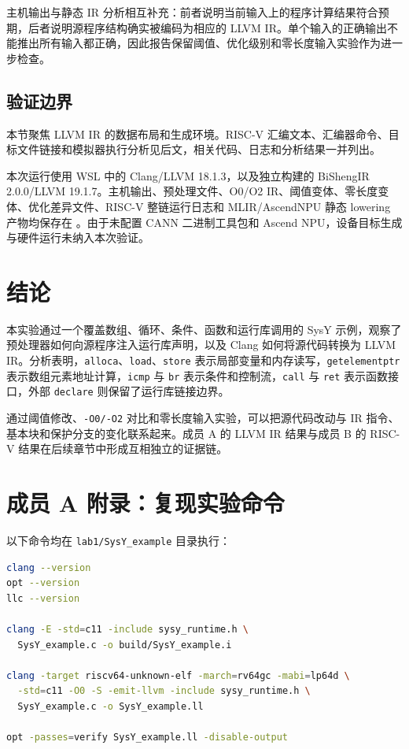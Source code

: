 \documentclass[a4paper]{article}
\begin{document}
主机输出与静态 IR 分析相互补充：前者说明当前输入上的程序计算结果符合预期，后者说明源程序结构确实被编码为相应的 LLVM IR。单个输入的正确输出不能推出所有输入都正确，因此报告保留阈值、优化级别和零长度输入实验作为进一步检查。

\subsection{验证边界}

本节聚焦 LLVM IR 的数据布局和生成环境。RISC-V 汇编文本、汇编器命令、目标文件链接和模拟器执行分析见后文，相关代码、日志和分析结果一并列出。

本次运行使用 WSL 中的 Clang/LLVM 18.1.3，以及独立构建的 BiShengIR 2.0.0/LLVM 19.1.7。主机输出、预处理文件、O0/O2 IR、阈值变体、零长度变体、优化差异文件、RISC-V 整链运行日志和 MLIR/AscendNPU 静态 lowering 产物均保存在 。由于未配置 CANN 二进制工具包和 Ascend NPU，设备目标生成与硬件运行未纳入本次验证。

\section{结论}

本实验通过一个覆盖数组、循环、条件、函数和运行库调用的 SysY 示例，观察了预处理器如何向源程序注入运行库声明，以及 Clang 如何将源代码转换为 LLVM IR。分析表明，\texttt{alloca}、\texttt{load}、\texttt{store} 表示局部变量和内存读写，\texttt{getelementptr} 表示数组元素地址计算，\texttt{icmp} 与 \texttt{br} 表示条件和控制流，\texttt{call} 与 \texttt{ret} 表示函数接口，外部 \texttt{declare} 则保留了运行库链接边界。

通过阈值修改、\texttt{-O0/-O2} 对比和零长度输入实验，可以把源代码改动与 IR 指令、基本块和保护分支的变化联系起来。成员 A 的 LLVM IR 结果与成员 B 的 RISC-V 结果在后续章节中形成互相独立的证据链。

\clearpage
\section*{成员 A 附录：复现实验命令}

以下命令均在 \texttt{lab1/SysY\_example} 目录执行：

\begin{lstlisting}[language=bash,caption={LLVM IR 实验的最小复现命令}]
clang --version
opt --version
llc --version

clang -E -std=c11 -include sysy_runtime.h \
  SysY_example.c -o build/SysY_example.i

clang -target riscv64-unknown-elf -march=rv64gc -mabi=lp64d \
  -std=c11 -O0 -S -emit-llvm -include sysy_runtime.h \
  SysY_example.c -o SysY_example.ll

opt -passes=verify SysY_example.ll -disable-output
\end{lstlisting}
\end{document}
